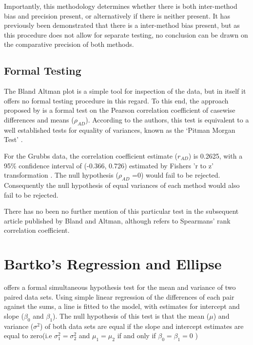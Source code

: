 \documentclass[12pt, a4paper]{article}
\begin{document}
Importantly, this methodology determines whether there is both
inter-method bias and precision present, or alternatively if there
is neither present. It has previously been demonstrated that there
is a inter-method bias present, but as this procedure does not
allow for separate testing, no conclusion can be drawn on the
comparative precision of both methods.

\subsection{Formal Testing}
The Bland Altman plot is a simple tool for inspection of the data,
but in itself it offers no formal testing procedure in this
regard. To this end, the approach proposed by \citet{BA83} is a
formal test on the Pearson correlation coefficient  of casewise
differences and means ($\rho_{AD}$). According to the authors,
this test is equivalent to a well established tests for equality
of variances, known as the `Pitman Morgan Test' \citep{Pitman,
Morgan}.

For the Grubbs data, the correlation coefficient estimate
($r_{AD}$) is 0.2625, with a 95\% confidence interval of (-0.366,
0.726) estimated by Fishers 'r to z' transformation \citep{Cohen}.
The null hypothesis ($\rho_{AD}$ =0) would fail to be rejected.
Consequently the null hypothesis of equal variances of each method
would also fail to be rejected.

There has no been no further mention of this particular test in
the subsequent article published by Bland and Altman, although
\citet{BA99} refers to Spearmans' rank correlation coefficient.


\newpage

\section{Bartko's Regression and Ellipse}
\citet{BB89} offers a formal simultaneous hypothesis test for the
mean and variance of two paired data sets. Using simple linear
regression of the differences of each pair against the sums, a
line is fitted to the model, with estimates for intercept and
slope ($\beta_{0}$ and $\beta_{1}$). The null hypothesis of this
test is that the mean ($\mu$) and variance ($\sigma^{2}$) of both
data sets are equal if the slope and intercept estimates are equal
to zero(i.e $\sigma^{2}_{1} = \sigma^{2}_{2}$ and
$\mu_{1}=\mu_{2}$ if and only if $\beta_{0}= \beta_{1}=0$ )
\end{document}

